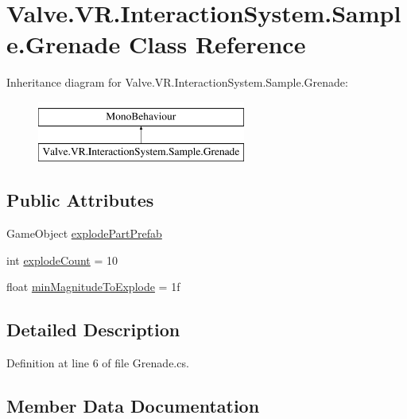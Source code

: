 \hypertarget{class_valve_1_1_v_r_1_1_interaction_system_1_1_sample_1_1_grenade}{}\section{Valve.\+V\+R.\+Interaction\+System.\+Sample.\+Grenade Class Reference}
\label{class_valve_1_1_v_r_1_1_interaction_system_1_1_sample_1_1_grenade}
Inheritance diagram for Valve.\+V\+R.\+Interaction\+System.\+Sample.\+Grenade\+:\begin{figure}[H]
\begin{center}
\leavevmode
\includegraphics[height=2.000000cm]{class_valve_1_1_v_r_1_1_interaction_system_1_1_sample_1_1_grenade}
\end{center}
\end{figure}
\subsection*{Public Attributes}
\begin{DoxyCompactItemize}
\item 
Game\+Object \mbox{\hyperlink{class_valve_1_1_v_r_1_1_interaction_system_1_1_sample_1_1_grenade_a35871cdd033148c6279bd16992cc656b}{explode\+Part\+Prefab}}
\item 
int \mbox{\hyperlink{class_valve_1_1_v_r_1_1_interaction_system_1_1_sample_1_1_grenade_aad5d8ce9979d97f5cc30ffe82f4bf550}{explode\+Count}} = 10
\item 
float \mbox{\hyperlink{class_valve_1_1_v_r_1_1_interaction_system_1_1_sample_1_1_grenade_ac7b2055641a0a93c3416d80dd9eeeb62}{min\+Magnitude\+To\+Explode}} = 1f
\end{DoxyCompactItemize}


\subsection{Detailed Description}


Definition at line 6 of file Grenade.\+cs.



\subsection{Member Data Documentation}
\mbox{\label{class_valve_1_1_v_r_1_1_interaction_system_1_1_sample_1_1_grenade_aad5d8ce9979d97f5cc30ffe82f4bf550}} 
